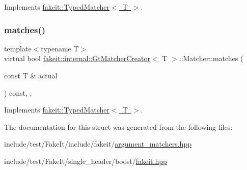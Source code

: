 Implements \mbox{\hyperlink{structfakeit_1_1TypedMatcher_ac553bb6ac7c98a489c92fa6ace0f2e2b}{fakeit\+::\+Typed\+Matcher$<$ T $>$}}.

\mbox{\label{structfakeit_1_1internal_1_1GtMatcherCreator_1_1Matcher_a94c09643f70784105c584eb3341a0cef}} 
\subsubsection{\texorpdfstring{matches()}{matches()}\hspace{0.1cm}{\footnotesize\ttfamily [9/9]}}
{\footnotesize\ttfamily template$<$typename T$>$ \\
virtual bool \mbox{\hyperlink{structfakeit_1_1internal_1_1GtMatcherCreator}{fakeit\+::internal\+::\+Gt\+Matcher\+Creator}}$<$ T $>$\+::Matcher\+::matches (\begin{DoxyParamCaption}\item[{const T \&}]{actual }\end{DoxyParamCaption}) const\hspace{0.3cm}{\ttfamily [inline]}, {\ttfamily [override]}, {\ttfamily [virtual]}}



Implements \mbox{\hyperlink{structfakeit_1_1TypedMatcher_ac553bb6ac7c98a489c92fa6ace0f2e2b}{fakeit\+::\+Typed\+Matcher$<$ T $>$}}.



The documentation for this struct was generated from the following files\+:\begin{DoxyCompactItemize}
\item 
include/test/\+Fake\+It/include/fakeit/\mbox{\hyperlink{argument__matchers_8hpp}{argument\+\_\+matchers.\+hpp}}\item 
include/test/\+Fake\+It/single\+\_\+header/boost/\mbox{\hyperlink{single__header_2boost_2fakeit_8hpp}{fakeit.\+hpp}}\end{DoxyCompactItemize}
